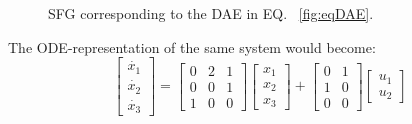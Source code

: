 \begin{figure}
\caption{SFG corresponding to the DAE in EQ. ~\ref{fig:eqDAE}.}
\label{fig:sfgDAE}
\end{figure}
%
The ODE-representation of the same system would become:
\begin{equation}\left[ \begin{array}{c} \dot{x_1} \\ \dot{x_2} \\ \dot{x_3} \end{array} \right]
= \begin{bmatrix} 0 & 2 & 1 \\ 0 & 0 & 1 \\ 1 & 0 & 0 \end{bmatrix} \left[ \begin{array}{c} x_1 \\ x_2 \\ x_3 \end{array} \right] + \begin{bmatrix} 0 & 1 \\ 1 & 0 \\ 0 & 0 \end{bmatrix}  \left[ \begin{array}{c} u_1 \\ u_2 \end{array} \right]
\label{fig:eqODEett}
\end{equation}
